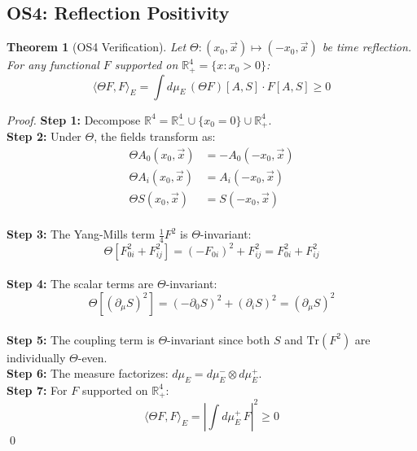 \documentclass[11pt,a4paper]{article}
\providecommand{\R}{\mathbb{R}}
\renewcommand{\Tr}{\mathrm{Tr}}
\theoremstyle{plain}
\newtheorem{theorem}{Theorem}[section]
\theoremstyle{definition}
\begin{document}
\subsection{OS4: Reflection Positivity}

\begin{theorem}[OS4 Verification]
\label{thm:os4}
Let $\Theta: (x_0, \vec{x}) \mapsto (-x_0, \vec{x})$ be time reflection. For any functional $F$ supported on $\R^4_+ = \{x : x_0 > 0\}$:
\begin{equation}
\langle \Theta F, F \rangle_E = \int d\mu_E\, (\Theta F)[A,S] \cdot F[A,S] \geq 0
\end{equation}
\end{theorem}
\vspace{0.3em}
\begin{proof}
\textbf{Step 1:} Decompose $\R^4 = \R^4_- \cup \{x_0=0\} \cup \R^4_+$.
\vspace{0.7em}\\
\textbf{Step 2:} Under $\Theta$, the fields transform as:
\begin{align}
\Theta A_0(x_0, \vec{x}) &= -A_0(-x_0, \vec{x}) \\
\Theta A_i(x_0, \vec{x}) &= A_i(-x_0, \vec{x}) \\
\Theta S(x_0, \vec{x}) &= S(-x_0, \vec{x})
\end{align}
\vspace{0.3em}\\
\textbf{Step 3:} The Yang-Mills term $\frac{1}{4}F^2$ is $\Theta$-invariant:
\begin{equation}
\Theta[F_{0i}^2 + F_{ij}^2] = (-F_{0i})^2 + F_{ij}^2 = F_{0i}^2 + F_{ij}^2
\end{equation}
\vspace{0.3em}\\
\textbf{Step 4:} The scalar terms are $\Theta$-invariant:
\begin{equation}
\Theta[(\partial_\mu S)^2] = (-\partial_0 S)^2 + (\partial_i S)^2 = (\partial_\mu S)^2
\end{equation}
\vspace{0.3em}\\
\textbf{Step 5:} The coupling term is $\Theta$-invariant since both $S$ and $\Tr(F^2)$ are individually $\Theta$-even.
\vspace{0.3em}\\
\textbf{Step 6:} The measure factorizes: $d\mu_E = d\mu_E^- \otimes d\mu_E^+$.
\vspace{0.3em}\\
\textbf{Step 7:} For $F$ supported on $\R^4_+$:
\begin{equation}
\langle \Theta F, F \rangle_E = \left|\int d\mu_E^+\, F\right|^2 \geq 0
\end{equation}
\qed
\end{proof}
\end{document}
